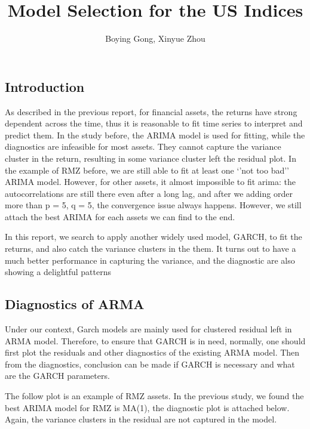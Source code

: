 \documentclass[12pt]{article}
\title{Model Selection for the US Indices}
\author{Boying Gong, Xinyue Zhou}
\begin{document}
\maketitle
\fi


\subsection{Introduction}
As described in the previous report, for financial assets, the returns have strong dependent across the time, thus it is reasonable to fit time series to interpret and predict them. In the study before,  the ARIMA model is used for fitting, while the diagnostics are infeasible for most assets. They cannot capture the variance cluster in the return, resulting in some variance cluster left the residual plot. In the example of RMZ  before, we are still able to fit at least one `'not too bad'' ARIMA model. However, for other assets, it almost impossible to fit arima: the autocorrelations are still there even after a long lag, and after we adding order more than p = 5, q = 5, the convergence issue always happens. However, we still attach the best ARIMA for each assets we can find to the end.

In this report, we search to apply another widely used model, GARCH,  to fit the returns, and also catch the variance clusters in the them. It turns out to have a much better performance in capturing the variance, and the diagnostic are also showing a delightful patterns

\subsection{Diagnostics of ARMA}
Under our context, Garch models are mainly used for clustered residual left in ARMA model. Therefore, to ensure that GARCH is in need, normally, one should first plot the residuals and other diagnostics of the existing ARMA model. Then from the diagnostics, conclusion can be made if GARCH is necessary and what are the GARCH parameters.

The follow plot is an example of RMZ assets. In the previous study, we found the best ARIMA model for RMZ is MA(1), the diagnostic plot is attached below. Again, the variance clusters in the residual are not captured in the model.
\end{document}
